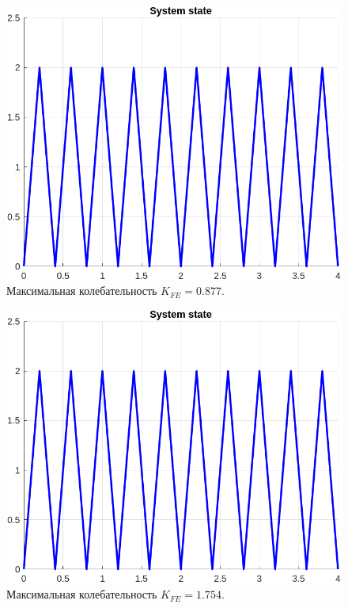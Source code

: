 \documentclass[a4paper, 14pt]{extarticle}
\theoremstyle{definition}
\theoremstyle{plain}
\theoremstyle{remark}
\begin{document}
\begin{figure}
    [H]
    \centering
    \includegraphics[width=350pt]{images/task1_d__max_state.png}
    \caption{Максимальная колебательность $K_{FE}=0.877$.}
\end{figure}
\begin{figure}
    [H]
    \centering
    \includegraphics[width=350pt]{images/task1_d__max_state.png}
    \caption{Максимальная колебательность $K_{FE}=1.754$.}
\end{figure}
\end{document}
